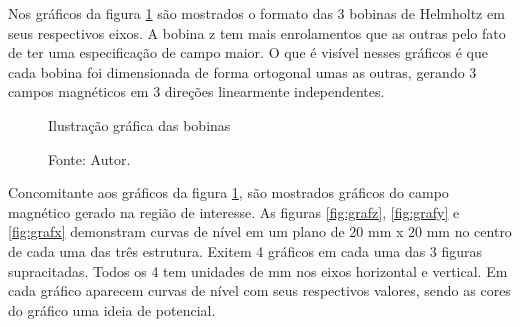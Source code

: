 Nos gráficos da figura \ref{fig:eixos} são mostrados o formato das 3 bobinas de Helmholtz em seus respectivos eixos. A bobina z tem mais enrolamentos que as outras pelo fato de ter uma especificação de campo maior. O que é visível nesses gráficos é que cada bobina foi dimensionada de forma ortogonal umas as outras, gerando 3 campos magnéticos em 3 direções linearmente independentes.

\begin{figure}[H]
    \centering
     \caption{Ilustração gráfica das bobinas}
     \caption*{Fonte: Autor.}\label{fig:eixos}
\end{figure}

Concomitante aos gráficos da figura \ref{fig:eixos}, são mostrados gráficos do campo magnético gerado na região de interesse. As figuras \ref{fig:grafz}, \ref{fig:grafy} e \ref{fig:grafx} demonstram curvas de nível em um plano de 20 mm x 20 mm no centro de cada uma das três estrutura. Exitem 4 gráficos em cada uma das 3 figuras supracitadas. Todos os 4 tem unidades de mm nos eixos horizontal e vertical. Em cada gráfico aparecem curvas de nível com seus respectivos valores, sendo as cores do gráfico uma ideia de potencial.

